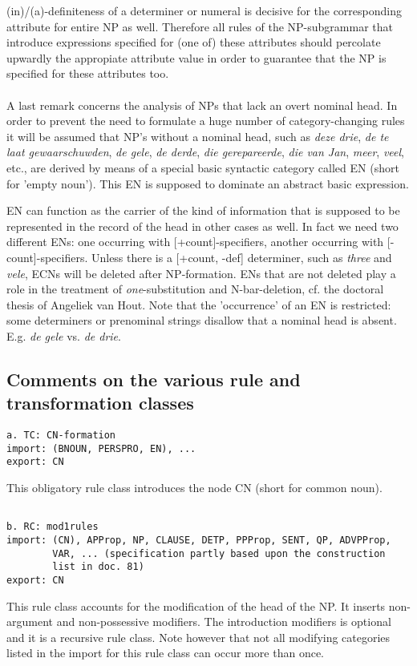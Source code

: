 (in)/(a)-definiteness of a determiner or numeral is decisive for the
corresponding attribute for entire NP as well. Therefore all rules of the
NP-subgrammar that introduce expressions specified for (one of) these
attributes should percolate upwardly the appropiate attribute value in order to
guarantee that the NP is specified for these attributes too.\\ \\ 
A last remark concerns the analysis of NPs that lack an overt nominal head. In
order to prevent the need to formulate a huge number of category-changing rules
it will be assumed that NP's without a nominal head, such as 
{\em deze drie}, {\em de
te laat gewaarschuwden}, {\em de gele}, {\em de derde}, 
{\em die gerepareerde}, {\em die van
Jan}, {\em meer}, {\em veel}, etc., are derived by means of a special basic syntactic
category called EN (short for 'empty noun'). 
This EN is supposed to dominate an abstract
basic expression. 

EN can function as the carrier of the kind of information that is supposed to
be represented in the record of the head in other cases as well. In fact we
need two different ENs: one occurring with [+count]-specifiers, another
occurring with [-count]-specifiers. Unless there is a [+count, -def]
determiner, such as {\em three} and {\em vele}, ECNs  will be deleted after
NP-formation. ENs that are not deleted play a role in the treatment of
{\em one}-substitution and N-bar-deletion, cf. the doctoral thesis of Angeliek van
Hout. Note that the 'occurrence' of an EN is restricted: some determiners or
prenominal strings disallow that a nominal head is absent. E.g. {\em de gele}
vs. {\em *de drie}.

\subsection{Comments on the various rule and transformation classes}
\begin{verbatim}
a. TC: CN-formation
import: (BNOUN, PERSPRO, EN), ...
export: CN
\end{verbatim}
This obligatory rule class introduces the node CN (short for common noun).
\begin{verbatim}

b. RC: mod1rules
import: (CN), APProp, NP, CLAUSE, DETP, PPProp, SENT, QP, ADVPProp, 
        VAR, ... (specification partly based upon the construction 
        list in doc. 81)
export: CN
\end{verbatim}
This rule class accounts for the modification of the head of the NP. It inserts
non-argument and non-possessive modifiers. The introduction modifiers is
optional and it is a recursive rule class. Note however that not all modifying
categories listed in the import for this rule class can occur more than once. 

